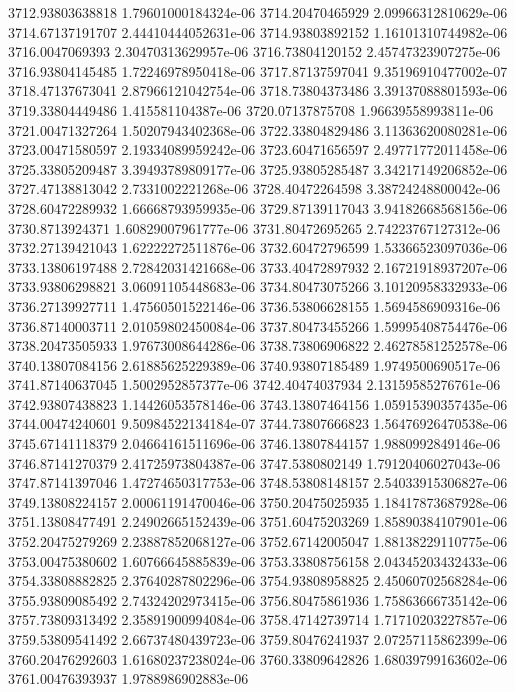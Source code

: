 {3712.93803638818 1.79601000184324e-06
3714.20470465929 2.09966312810629e-06
3714.67137191707 2.44410444052631e-06
3714.93803892152 1.16101310744982e-06
3716.0047069393 2.30470313629957e-06
3716.73804120152 2.45747323907275e-06
3716.93804145485 1.72246978950418e-06
3717.87137597041 9.35196910477002e-07
3718.47137673041 2.87966121042754e-06
3718.73804373486 3.39137088801593e-06
3719.33804449486 1.415581104387e-06
3720.07137875708 1.96639558993811e-06
3721.00471327264 1.50207943402368e-06
3722.33804829486 3.11363620080281e-06
3723.00471580597 2.19334089959242e-06
3723.60471656597 2.49771772011458e-06
3725.33805209487 3.39493789809177e-06
3725.93805285487 3.34217149206852e-06
3727.47138813042 2.7331002221268e-06
3728.40472264598 3.38724248800042e-06
3728.60472289932 1.66668793959935e-06
3729.87139117043 3.94182668568156e-06
3730.8713924371 1.60829007961777e-06
3731.80472695265 2.74223767127312e-06
3732.27139421043 1.62222272511876e-06
3732.60472796599 1.53366523097036e-06
3733.13806197488 2.72842031421668e-06
3733.40472897932 2.16721918937207e-06
3733.93806298821 3.06091105448683e-06
3734.80473075266 3.10120958332933e-06
3736.27139927711 1.47560501522146e-06
3736.53806628155 1.5694586909316e-06
3736.87140003711 2.01059802450084e-06
3737.80473455266 1.59995408754476e-06
3738.20473505933 1.97673008644286e-06
3738.73806906822 2.46278581252578e-06
3740.13807084156 2.61885625229389e-06
3740.93807185489 1.9749500690517e-06
3741.87140637045 1.5002952857377e-06
3742.40474037934 2.13159585276761e-06
3742.93807438823 1.14426053578146e-06
3743.13807464156 1.05915390357435e-06
3744.00474240601 9.50984522134184e-07
3744.73807666823 1.56476926470538e-06
3745.67141118379 2.04664161511696e-06
3746.13807844157 1.9880992849146e-06
3746.87141270379 2.41725973804387e-06
3747.5380802149 1.79120406027043e-06
3747.87141397046 1.47274650317753e-06
3748.53808148157 2.54033915306827e-06
3749.13808224157 2.00061191470046e-06
3750.20475025935 1.18417873687928e-06
3751.13808477491 2.24902665152439e-06
3751.60475203269 1.85890384107901e-06
3752.20475279269 2.23887852068127e-06
3752.67142005047 1.88138229110775e-06
3753.00475380602 1.60766645885839e-06
3753.33808756158 2.04345203432433e-06
3754.33808882825 2.37640287802296e-06
3754.93808958825 2.45060702568284e-06
3755.93809085492 2.74324202973415e-06
3756.80475861936 1.75863666735142e-06
3757.73809313492 2.35891900994084e-06
3758.47142739714 1.71710203227857e-06
3759.53809541492 2.66737480439723e-06
3759.80476241937 2.07257115862399e-06
3760.20476292603 1.61680237238024e-06
3760.33809642826 1.68039799163602e-06
3761.00476393937 1.9788986902883e-06
}
